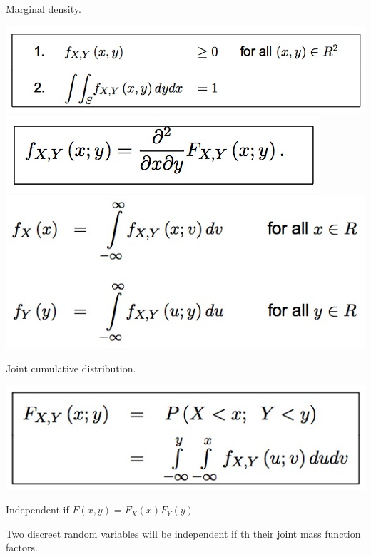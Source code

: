 \documentclass{examnotes}
\begin{document}
{

Marginal density.

\includegraphics[scale=0.4]{./img/3con1.jpg}                                         
\includegraphics[scale=0.4]{./img/3con2.jpg}                                         
\includegraphics[scale=0.4]{./img/3con3.jpg}                                         


Joint cumulative distribution.

\includegraphics[scale=0.4]{./img/3con4.jpg}                                         


Independent if $F(x,y)=F_X(x)F_Y(y)$

Two discreet random variables will be independent if th their joint mass function factors.

}
\end{document}
